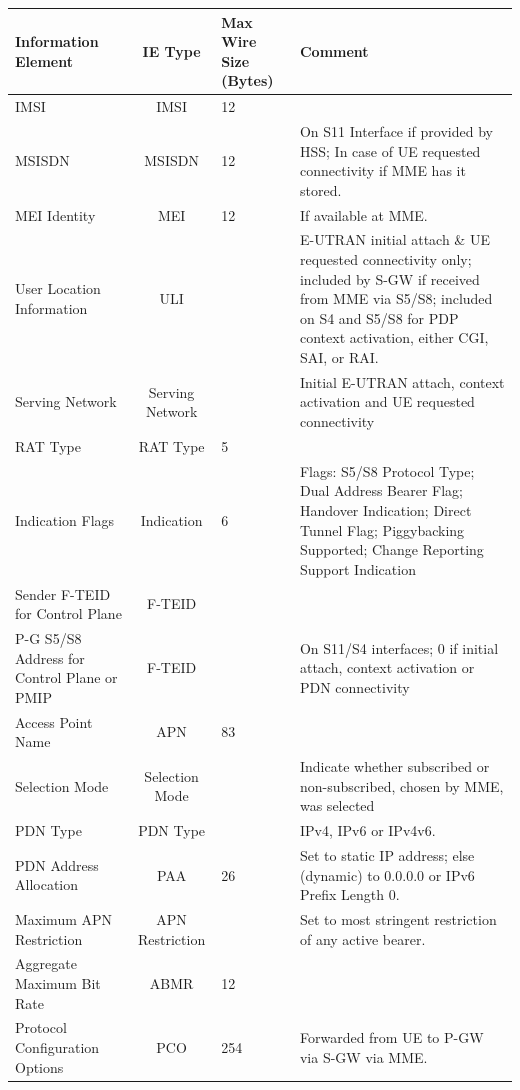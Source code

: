 \begin{longtabu}{|p{2cm}|c|p{1.5cm}|p{8cm}|}
\hline
Information Element 						& IE Type 					& Max Wire Size (Bytes)	& Comment \\ \hline
IMSI 										& IMSI 						& 12					& \\ \hline
MSISDN 										& MSISDN					& 12					& On S11 Interface if provided by HSS; In case of UE requested connectivity if MME has it stored. \\ \hline
MEI Identity 								& MEI 						& 12					& If available at MME. \\ \hline
User Location Information 					& ULI						& 						& E-UTRAN initial attach \&  UE requested connectivity only; included by S-GW if received from MME via S5/S8; included on S4 and S5/S8 for PDP context activation, either CGI, SAI, or RAI. \\ \hline
Serving Network								& Serving Network			& 						& Initial E-UTRAN attach, context activation and UE requested connectivity \\ \hline
RAT Type									& RAT Type					& 5						& \\ \hline
Indication Flags							& Indication				& 6						& Flags: S5/S8 Protocol Type; Dual Address Bearer Flag; Handover Indication; Direct Tunnel Flag; Piggybacking Supported; Change Reporting Support Indication \\ \hline
Sender F-TEID for Control Plane				& F-TEID					& 						& \\ \hline
P-G S5/S8 Address for Control Plane or PMIP	& F-TEID					& 						& On S11/S4 interfaces; 0 if initial attach, context activation or PDN connectivity \\ \hline
Access Point Name							& APN						& 83					& \\ \hline
Selection Mode								& Selection Mode			& 						& Indicate whether subscribed or non-subscribed, chosen by MME, was selected \\ \hline
PDN Type									& PDN Type					& 						& IPv4, IPv6 or IPv4v6. \\ \hline
PDN Address Allocation						& PAA						& 26					& Set to static IP address; else (dynamic) to 0.0.0.0 or IPv6 Prefix Length 0. \\ \hline
Maximum APN Restriction						& APN Restriction			& 						& Set to most stringent restriction of any active bearer. \\ \hline
Aggregate Maximum Bit Rate					& ABMR						& 12					& \\ \hline
Protocol Configuration Options				& PCO						& 254					& Forwarded from UE to P-GW via S-GW via MME. \\ \hline

\end{longtabu}
